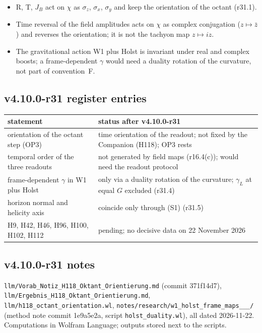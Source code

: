 \begin{itemize}[leftmargin=2em]
\item R, T, \(J_B\) act on \(\chi\) as \(\sigma_z\), \(\sigma_x\), \(\sigma_y\) and keep the orientation of the octant (r31.1).
\item Time reversal of the field amplitudes acts on \(\chi\) as complex conjugation (\(z\mapsto\bar z\)) and reverses the orientation; it is not
the tachyon map \(z\mapsto iz\).
\item The gravitational action W1 plus Holst is invariant under real and complex boosts; a frame-dependent \(\gamma\) would need a duality
rotation of the curvature, not part of convention~F.
\end{itemize}

\subsection*{v4.10.0-r31 register entries}
\label{subsec:v4100-r31-register}

\begin{center}
\small
\begin{tabular}{@{}>{\raggedright\arraybackslash}p{}>{\raggedright\arraybackslash}p{}@{}}
\toprule
statement & status after v4.10.0-r31\\
\midrule
orientation of the octant step (OP3) & time orientation of the readout; not fixed by the Companion (H118); OP3 rests\\
temporal order of the three readouts & not generated by field maps (r16.4(c)); would need the readout protocol\\
frame-dependent \(\gamma\) in W1 plus Holst & only via a duality rotation of the curvature; \(\gamma_L\) at equal \(G\) excluded (r31.4)\\
horizon normal and helicity axis & coincide only through (S1) (r31.5)\\
H9, H42, H46, H96, H100, H102, H112 & pending; no decisive data on 22 November 2026\\
\bottomrule
\end{tabular}
\end{center}

\subsection*{v4.10.0-r31 notes}
\label{subsec:v4100-r31-notes}

\texttt{llm/\allowbreak Vorab\_\allowbreak Notiz\_\allowbreak H118\_\allowbreak Oktant\_\allowbreak Orientierung.md} (commit 371f14d7),
\texttt{llm/\allowbreak Ergebnis\_\allowbreak H118\_\allowbreak Oktant\_\allowbreak Orientierung.md}, \texttt{llm/\allowbreak h118\_\allowbreak octant\_\allowbreak orientation.wl},
\texttt{notes/\allowbreak research/\allowbreak w1\_\allowbreak holst\_\allowbreak frame\_\allowbreak maps\_\_\_/} (method note commit 1e9a5e2a,
script \texttt{holst\_\allowbreak duality.wl}), all dated 2026-11-22.  Computations in Wolfram Language; outputs stored next to the scripts.

